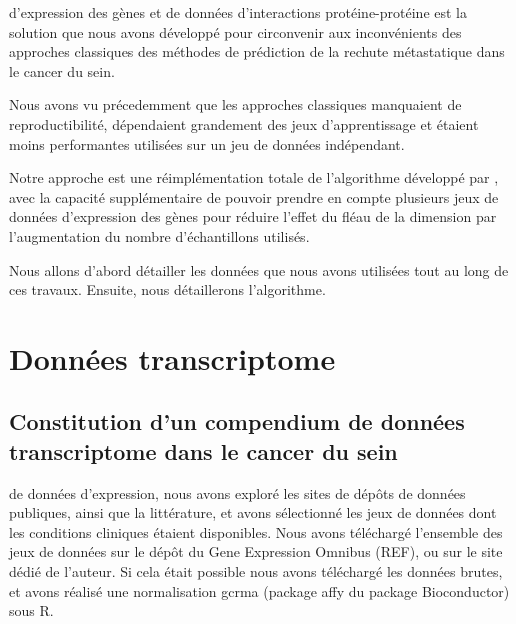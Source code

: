 			 d'expression des gènes et de données d'interactions protéine-protéine est la solution que nous avons développé pour circonvenir aux inconvénients des approches classiques des méthodes de prédiction de la rechute métastatique dans le cancer du sein.

			Nous avons vu précedemment que les approches classiques manquaient de reproductibilité, dépendaient grandement des jeux d'apprentissage et étaient moins performantes utilisées sur un jeu de données indépendant.

			Notre approche est une réimplémentation totale de l'algorithme développé par \citeauthor{Chuang2007}, avec la capacité supplémentaire de pouvoir prendre en compte plusieurs jeux de données d'expression des gènes pour réduire l'effet du fléau de la dimension par l'augmentation du nombre d'échantillons utilisés.

			Nous allons d'abord détailler les données que nous avons utilisées tout au long de ces travaux.
			Ensuite, nous détaillerons l'algorithme.

	\section{\textcolor{green!45!black}{Données transcriptome}}\label{sec:GEP}

		\subsection{\textcolor{green!45!black}{Constitution d'un compendium de données transcriptome dans le cancer du sein}}
			 de données d'expression, nous avons exploré les sites de dépôts de données publiques, ainsi que la littérature, et avons sélectionné les jeux de données dont les conditions cliniques étaient disponibles.
			Nous avons téléchargé l'ensemble des jeux de données sur le dépôt du Gene Expression Omnibus (REF), ou sur le site dédié de l'auteur. Si cela était possible nous avons téléchargé les données brutes, et avons réalisé une normalisation gcrma (package affy du package Bioconductor) sous R.

